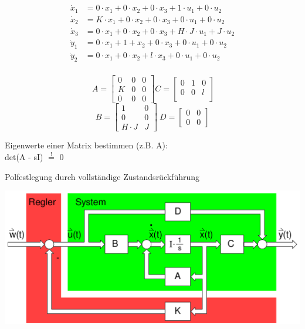 \documentclass[10pt,a4paper]{article}
\begin{document}
\begin{mdframed}[style=exercise]
	\begin{align*}
		\dot{x}_{1} & = 0\cdot x_{1} +0\cdot x_{2} +0\cdot x_{3} +1\cdot u_{1}+0\cdot u_{2}        \\
		\dot{x}_{2} & = K\cdot x_{1} +0\cdot x_{2} +0\cdot x_{3} +0\cdot u_{1}+0\cdot u_{2}        \\
		\dot{x}_{3} & = 0\cdot x_{1} +0\cdot x_{2} +0\cdot x_{3} +H\cdot J\cdot u_{1}+J\cdot u_{2} \\
		\dot{y}_{1} & = 0\cdot x_{1} +1+x_{2} +0\cdot x_{3} +0\cdot u_{1}+0\cdot u_{2}             \\
		\dot{y}_{2} & = 0\cdot x_{1} +0\cdot x_{2} +l\cdot x_{3} +0\cdot u_{1}+0\cdot u_{2}        \\
	\end{align*}
\end{mdframed}

\begin{mdframed}[style=exercise]
	\[
		\ A = \begin{bmatrix}
			0 & 0 & 0 \\
			K & 0 & 0 \\
			0 & 0 & 0
		\end{bmatrix}
		C = \begin{bmatrix}
			0 & 1 & 0 \\
			0 & 0 & l \\
		\end{bmatrix}\]
	\[B = \begin{bmatrix}
			1         & 0 \\
			0         & 0 \\
			H\cdot{}J & J
		\end{bmatrix} \
		D = \begin{bmatrix}
			0 & 0 \\
			0 & 0
		\end{bmatrix}
	\]

    Eigenwerte einer Matrix bestimmen (z.B. A):\\
    det(A - sI) $\stackrel{!}{=}$ 0
\end{mdframed}

Polfestlegung durch vollständige Zustandsrückführung

\includegraphics[width=0.9\columnwidth]{Figures/Polfestlegung.png}
\end{document}
